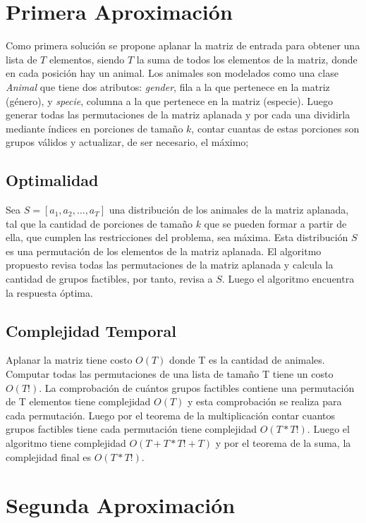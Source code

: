 \documentclass[article]{llncs}
\begin{document}
\section{Primera Aproximaci\'on}

Como primera soluci\'on se propone aplanar la matriz de entrada para 
obtener una lista de $T$ elementos, siendo $T$ la suma de todos los elementos de la matriz,
 donde en cada posici\'on hay un animal. 
Los animales son modelados como una clase \emph{Animal} que tiene dos 
atributos: \emph{gender}, fila a la que pertenece en la matriz (g\'enero),  
y \emph{specie}, columna a la que pertenece en la matriz (especie). Luego 
generar todas las permutaciones de la matriz aplanada y por cada una 
dividirla mediante \'indices en porciones de tamaño $k$, contar cuantas 
de estas porciones son grupos v\'alidos y actualizar, de ser necesario, el 
máximo;   

\subsection{Optimalidad}
Sea $S = [a_1, a_2, \dots, a_T]$ una distribución de los animales de la 
matriz aplanada, tal que la cantidad de porciones de tamaño $k$ que se pueden 
formar a partir de ella, que cumplen las restricciones del problema, sea máxima. 
Esta distribución $S$ es una permutación de los elementos de la matriz aplanada. 
El algoritmo propuesto revisa todas las permutaciones de la matriz aplanada y 
calcula la cantidad de grupos factibles, por tanto, revisa a $S$. Luego 
el algoritmo encuentra la respuesta óptima.

\subsection{Complejidad Temporal}

Aplanar la matriz tiene costo $O(T)$ donde T es la cantidad 
de animales. Computar todas las permutaciones de una lista 
de tamaño T tiene un costo $O(T!)$. La comprobación 
de cuántos grupos factibles contiene una permutación de T 
elementos tiene complejidad $O(T)$ y esta comprobación se realiza para cada permutación.
Luego por el teorema de la multiplicación contar cuantos grupos factibles tiene cada permutación 
tiene complejidad $O(T*T!)$. Luego el algoritmo 
tiene complejidad $O(T + T*T! + T)$ y por el teorema de la 
suma, la complejidad final es $O(T*T!)$.

\section{Segunda Aproximaci\'on}
\end{document}
